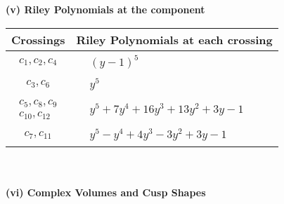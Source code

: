 \documentclass[1p]{elsarticle_modified}
\theoremstyle{definition}
\begin{document}
\newpage\renewcommand{\arraystretch}{1}
\flushleft \textbf{(v) Riley Polynomials at the component}\newline \\
\begin{tabular}{m{50pt}|m{274pt}}
Crossings & \hspace{64pt}Riley Polynomials at each crossing \\
\hline $$\begin{aligned}c_{1},c_{2},c_{4}\end{aligned}$$&$\begin{aligned}
&(y-1)^5
\end{aligned}$\\
\hline $$\begin{aligned}c_{3},c_{6}\end{aligned}$$&$\begin{aligned}
&y^5
\end{aligned}$\\
\hline $$\begin{aligned}c_{5},c_{8},c_{9}\\c_{10},c_{12}\end{aligned}$$&$\begin{aligned}
&y^5+7 y^4+16 y^3+13 y^2+3 y-1
\end{aligned}$\\
\hline $$\begin{aligned}c_{7},c_{11}\end{aligned}$$&$\begin{aligned}
&y^5- y^4+4 y^3-3 y^2+3 y-1
\end{aligned}$\\
\hline
\end{tabular}\\~\\
\newpage\flushleft \textbf{(vi) Complex Volumes and Cusp Shapes}
\end{document}
